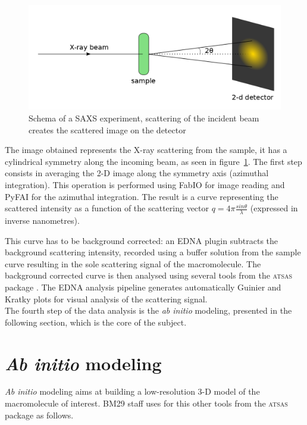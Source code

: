 \documentclass[a4paper, 11pt]{report}
\begin{document}
\begin{figure}
\centering
\includegraphics[scale=0.3]{schemaSAXS.png}
\caption{Schema of a SAXS experiment, scattering of the incident beam 
    creates the scattered image on the detector}
\label{fgr:schemaSAXS}
\end{figure}

The image obtained represents the X-ray scattering from the sample, it 
has a cylindrical symmetry along the incoming beam, as seen in 
figure~\ref{fgr:schemaSAXS}. 
The first step consists in averaging the 2-D image along the 
symmetry axis (azimuthal integration).  
This operation is performed using FabIO \cite{fabio} for image reading 
and PyFAI \cite{pyFAI} for the azimuthal integration. 
The result is a curve representing the scattered intensity as a 
function of the scattering vector $q = 4 \pi \frac{sin\theta}{\lambda}$ 
(expressed in inverse nanometres).

This curve has to be background corrected: an EDNA plugin subtracts the
background scattering intensity, recorded using a buffer
solution from the sample curve resulting in the sole scattering signal 
of the macromolecule. 
The background corrected curve is then analysed using several tools 
from the \textsc{atsas} package \cite{atsas}. 
The EDNA analysis pipeline generates automatically Guinier and Kratky
plots for visual analysis of the scattering signal.\\

The fourth step of the data analysis is the \textit{ab initio} modeling, 
presented in the following section, which is the core of the subject.

\section{\textit{Ab initio} modeling}
\label{modeling}                           %

\textit{Ab initio} modeling aims at building a low-resolution 3-D 
model of the macromolecule of interest. 
BM29 staff uses for this other tools from the \textsc{atsas} package 
as follows.\\
\end{document}
